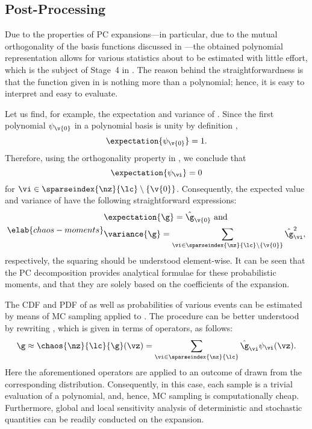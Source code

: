 \subsection{Post-Processing}

Due to the properties of \ac{PC} expansions---in particular, due to the mutual
orthogonality of the basis functions discussed in ---the
obtained polynomial representation allows for various statistics about \g to be
estimated with little effort, which is the subject of Stage~4 in
. The reason behind the straightforwardness is that the
function given in  is nothing more than a polynomial;
hence, it is easy to interpret and easy to evaluate.

Let us find, for example, the expectation and variance of \g. Since the first
polynomial $\psi_{\v{0}}$ in a polynomial basis is unity by definition
\cite{xiu2010},
\[
  \expectation{\psi_{\v{0}}} = 1.
\]
Therefore, using the orthogonality property in , we
conclude that
\[
  \expectation{\psi_{\vi}} = 0
\]
for $\vi \in \sparseindex{\nz}{\lc} \setminus \{ \v{0} \}$. Consequently, the
expected value and variance of \g have the following straightforward
expressions:
\begin{equation} \elab{chaos-moments}
  \begin{split}
    & \expectation{\g} = \hat{\g}_{\v{0}} \text{ and} \\
    & \variance{\g} = \sum_{\vi \in \sparseindex{\nz}{\lc} \setminus \{ \v{0} \}} \hat{\g}_{\vi}^2,
  \end{split}
\end{equation}
respectively, the squaring should be understood element-wise. It can be seen
that the \ac{PC} decomposition provides analytical formulae for these
probabilistic moments, and that they are solely based on the coefficients of the
expansion.

The \ac{CDF} and \ac{PDF} of \g as well as probabilities of various events can
be estimated by means of \ac{MC} sampling applied to . The
procedure can be better understood by rewriting , which is
given in terms of operators, as follows:
\[
  \g \approx \chaos{\nz}{\lc}{\g}(\vz) = \sum_{\vi \in \sparseindex{\nz}{\lc}} \hat{\g}_{\vi} \psi_{\vi}(\vz).
\]
Here the aforementioned operators are applied to an outcome of \vz drawn from
the corresponding distribution. Consequently, in this case, each sample is a
trivial evaluation of a polynomial, and, hence, \ac{MC} sampling is
computationally cheap. Furthermore, global and local sensitivity analysis of
deterministic and stochastic quantities can be readily conducted on the
expansion.

